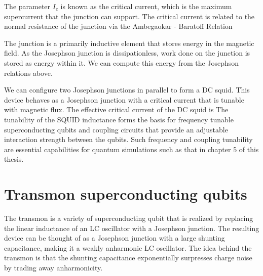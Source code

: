 
The parameter $I_c$ is known as the critical current, which is the maximum supercurrent that the junction can support.
The critical current is related to the normal resistance of the junction via the
Ambegaokar - Baratoff Relation \cite{Ambegaokar1963}

The junction is a primarily inductive element that stores energy in the magnetic field.  %
As the Josephson junction is dissipationless, work done on the junction is stored as energy within it.
We can compute this energy from the Josephson relations above.

We can configure two Josephson junctions in parallel to form a DC squid.
This device behaves as a Josephson junction with a critical current that is tunable with magnetic flux.
The effective critical current of the DC squid is \cite{vanDuzer1999}
The tunability of the SQUID inductance forms the basis for frequency tunable superconducting qubits
and coupling circuits that provide an adjustable interaction strength between the qubits.
Such frequency and coupling tunability are essential capabilities for quantum simulations such as that in chapter 5 of this thesis.

\section{Transmon superconducting qubits}

The transmon is a variety of superconducting qubit that is realized by replacing the linear inductance of an LC oscillator with a Josephson junction.
The resulting device can be thought of as a Josephson junction with a large shunting capacitance, making it a weakly anharmonic LC oscillator.
The idea behind the transmon is that the shunting capacitance exponentially surpresses charge noise by trading away anharmonicity\cite{Koch2007}.

